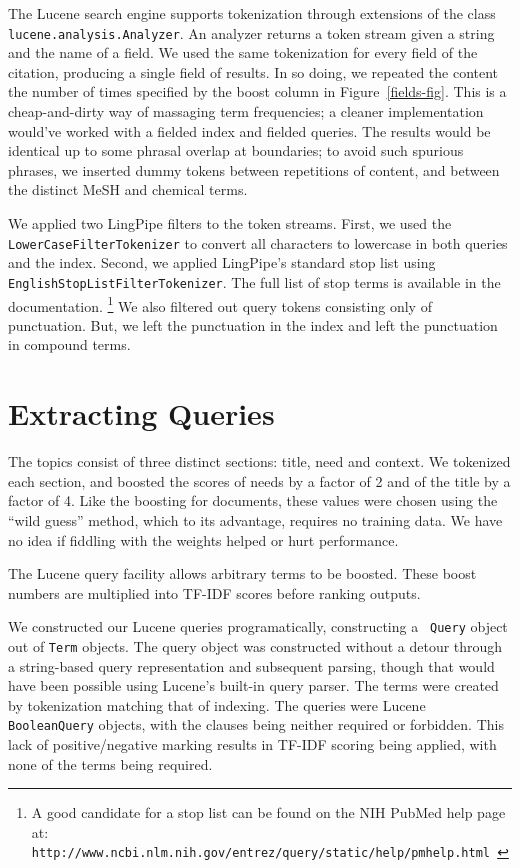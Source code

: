 \documentclass[11pt,oneside]{article}
\begin{document}
The Lucene search engine supports tokenization through extensions of
the class {\tt lucene.analysis.Analyzer}.  An analyzer returns a token
stream given a string and the name of a field.  We used the same
tokenization for every field of the citation, producing a single field
of results. In so doing, we repeated the content the number of times
specified by the boost column in Figure~\ref{fields-fig}.  This is a
cheap-and-dirty way of massaging term frequencies; a cleaner
implementation would've worked with a fielded index and fielded
queries.  The results would be identical up to some phrasal overlap at
boundaries; to avoid such spurious phrases, we inserted dummy tokens
between repetitions of content, and between the distinct MeSH and
chemical terms.

We applied two LingPipe filters to the token streams.  First, we used
the {\tt LowerCaseFilterTokenizer} to convert all characters to
lowercase in both queries and the index.  Second, we applied
LingPipe's standard stop list using {\tt
EnglishStopListFilterTokenizer}.  The full list of stop terms is
available in the documentation.%
\footnote{A good candidate for a stop list can be found on the NIH PubMed
help page at:
{\small\tt
http://www.ncbi.nlm.nih.gov/entrez/query/static/help/pmhelp.html
}}
%
We also filtered out query tokens consisting only of punctuation.  But,
we left the punctuation in the index and left the punctuation in
compound terms.


\section*{Extracting Queries}

The topics consist of three distinct sections: title, need and
context.  We tokenized each section, and boosted the scores of needs
by a factor of 2 and of the title by a factor of 4.  Like the boosting
for documents, these values were chosen using the ``wild guess''
method, which to its advantage, requires no training data.  We have no
idea if fiddling with the weights helped or hurt performance.

The Lucene query facility allows arbitrary terms to be boosted.  These
boost numbers are multiplied into TF-IDF scores before ranking
outputs.  

We constructed our Lucene queries programatically, constructing a {\tt
Query} object out of {\tt Term} objects.  The query object was
constructed without a detour through a string-based query
representation and subsequent parsing, though that would have been
possible using Lucene's built-in query parser.  The terms were created
by tokenization matching that of indexing.  The queries were Lucene
{\tt BooleanQuery} objects, with the clauses being neither required or
forbidden.  This lack of positive/negative marking results in TF-IDF
scoring being applied, with none of the terms being required.
\end{document}
